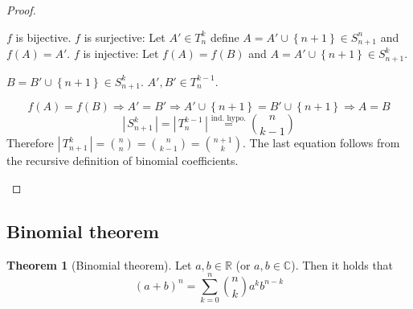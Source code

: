 \documentclass[a4paper,landscape,twocolumn]{article}
\theoremstyle{definition}
\newtheorem{theorem}{Theorem}
\newcommand\set[1]{\left\{#1\right\}}
\newcommand\card[1]{\left|\,#1\,\right|}
\begin{document}
\begin{proof}
\begin{description}
      $f$ is bijective.
      $f$ is surjective: Let $A' \in T_n^k$ define $A = A' \cup \set{n+1} \in S_{n+1}^n$ and $f(A) = A'$.
      $f$ is injective: Let $f(A) = f(B)$ and $A = A' \cup \set{n+1} \in S_{n+1}^k$.

      $B = B' \cup \set{n+1} \in S_{n+1}^k$. $A', B' \in T_n^{k-1}$.

      \[ f(A) = f(B) \Rightarrow A' = B' \Rightarrow A' \cup \set{n+1} = B' \cup \set{n+1} \Rightarrow A = B \]
      \[ \card{S_{n+1}^k} = \card{T_n^{k-1}} \stackrel{\text{ind. hypo.}}{=} \binom{n}{k-1} \]
      Therefore $\card{T_{n+1}^k} = \binom nn = \binom n{k-1} = \binom{n+1}{k}$.
      The last equation follows from the recursive definition of binomial coefficients.
  \end{description}
\end{proof}

\subsection{Binomial theorem}
\begin{theorem}[Binomial theorem]
  Let $a, b \in \mathbb{R}$ (or $a, b \in \mathbb{C}$). Then it holds that
  \[ (a + b)^n = \sum_{k=0}^n \binom{n}{k} a^k b^{n-k} \]
\end{theorem}
\end{document}
